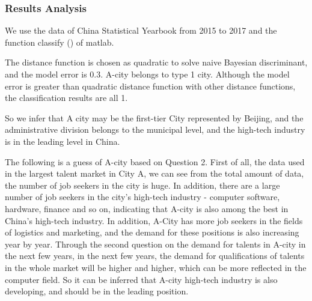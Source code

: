 \documentclass{mcmthesis}
\begin{document}
\subsubsection{Results Analysis}
We use the data of China Statistical Yearbook from 2015 to 2017 and the function classify () of matlab.
\par\noindent
The distance function is chosen as quadratic to solve naive Bayesian discriminant, and the model error is 0.3. A-city belongs to type 1 city. Although the model error is greater than quadratic distance function with other distance functions, the classification results are all 1.
\par\noindent
So we infer that A city may be the first-tier City represented by Beijing, and the administrative division belongs to the municipal level, and the high-tech industry is in the leading level in China.
\par\noindent
The following is a guess of A-city based on Question 2. First of all, the data used in the largest talent market in City A, we can see from the total amount of data, the number of job seekers in the city is huge. In addition, there are a large number of job seekers in the city's high-tech industry - computer software, hardware, finance and so on, indicating that A-city is also among the best in China's high-tech industry. In addition, A-City has more job seekers in the fields of logistics and marketing, and the demand for these positions is also increasing year by year. Through the second question on the demand for talents in A-city in the next few years, in the next few years, the demand for qualifications of talents in the whole market will be higher and higher, which can be more reflected in the computer field. So it can be inferred that A-city high-tech industry is also developing, and should be in the leading position.
\end{document}
